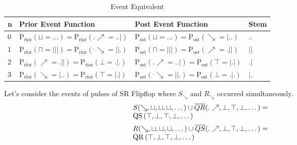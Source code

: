 \documentclass[10pt,journal]{IEEEtran}
\begin{document}
\begin{table}[H] \caption{Event Equivalent}     \centering                                                               \begin{tabular}{|p{.1cm}|p{3cm}|p{3cm}|p{.4cm}|}               \hline n&Prior Event Function&Post Event Function&Stem      \\ \hline 0&$\operatorname{P_{rior}}{\left(\sqcup = ... \right)} = \operatorname{P_{rior}}{\left(.\nearrow = ..| \right)}$          &$\operatorname{P_{ost}}{\left(\sqcup = ... \right)} = \operatorname{P_{ost}}{\left(\searrow = |.. \right)}$& $..$\\ \hline 1&$\operatorname{P_{rior}}{\left(\sqcap = ||| \right)} = \operatorname{P_{rior}}{\left(^.\searrow = ||. \right)}$          &$\operatorname{P_{ost}}{\left(\sqcap = ||| \right)} = \operatorname{P_{ost}}{\left(\nearrow = .|| \right)}$& $||$\\ \hline 2&$\operatorname{P_{rior}}{\left(\nearrow = .|| \right)} = \operatorname{P_{rior}}{\left(\bot = .|. \right)}$          &$\operatorname{P_{ost}}{\left(.\nearrow = ..| \right)} = \operatorname{P_{ost}}{\left(\top = |.| \right)}$& $.|$  \\ \hline 3&$\operatorname{P_{rior}}{\left(\searrow = |.. \right)} = \operatorname{P_{rior}}{\left(\top = |.| \right)}$          &$\operatorname{P_{ost}}{\left(^.\searrow = ||. \right)} = \operatorname{P_{ost}}{\left(\bot = .|. \right)}$& $|.$  \\ \hline \end{tabular} \end{table} 
Let's consider the events of pulses of SR Flipflop where $S_{\searrow}$ and $R_{\searrow}$ occurred simultaneously. 
\begin{equation}
 \begin{minipage}{250pt}
\begin{flushleft} $\displaystyle S{\left(\searrow,\sqcup,\sqcup,\sqcup,\dots \right)} \cup \overline{QR}{\left(.\nearrow,\bot,\top,\bot,\dots \right)} = \operatorname{QS}{\left(\top,\bot,\top,\bot,\dots \right)}$  \end{flushleft}
 \end{minipage}
 \end{equation}
\begin{equation}
 \begin{minipage}{250pt}
\begin{flushleft} $\displaystyle R{\left(\searrow,\sqcup,\sqcup,\sqcup,\dots \right)} \cup \overline{QS}{\left(.\nearrow,\bot,\top,\bot,\dots \right)} = \operatorname{QR}{\left(\top,\bot,\top,\bot,\dots \right)}$  \end{flushleft}
 \end{minipage}
 \end{equation}
\end{document}

